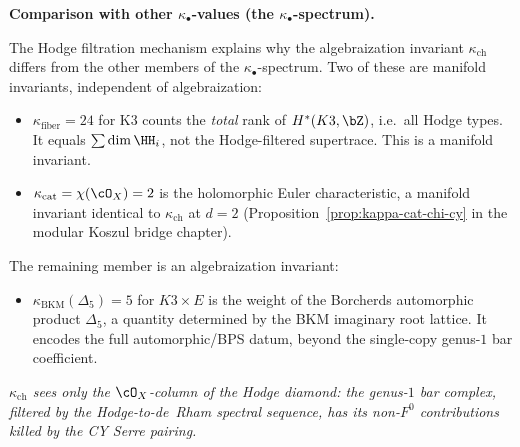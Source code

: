 \begin{remark}
\medskip\noindent
\textbf{Comparison with other $\kappa_\bullet$-values (the $\kappa_\bullet$-spectrum).}

\smallskip\noindent
The Hodge filtration mechanism explains why the algebraization invariant $\kappa_{\mathrm{ch}}$ differs from the other members of the $\kappa_\bullet$-spectrum. Two of these are manifold invariants, independent of algebraization:
\begin{itemize}
 \item $\kappa_{\mathrm{fiber}} = 24$ for K3 counts the \emph{total} rank of $H^*(K3, \bZ)$, i.e.\ all Hodge types. It equals $\sum \dim \HH_i$, not the Hodge-filtered supertrace. This is a manifold invariant.
 \item $\kappa_{\mathrm{cat}} = \chi(\cO_X) = 2$ is the holomorphic Euler characteristic, a manifold invariant identical to $\kappa_{\mathrm{ch}}$ at $d = 2$ (Proposition~\ref{prop:kappa-cat-chi-cy} in the modular Koszul bridge chapter).
\end{itemize}
The remaining member is an algebraization invariant:
\begin{itemize}
 \item $\kappa_{\mathrm{BKM}}(\Delta_5) = 5$ for $K3 \times E$ is the weight of the Borcherds automorphic product $\Delta_5$, a quantity determined by the BKM imaginary root lattice. It encodes the full automorphic/BPS datum, beyond the single-copy genus-$1$ bar coefficient.
\end{itemize}
\emph{$\kappa_{\mathrm{ch}}$ sees only the $\cO_X$-column of the Hodge diamond: the genus-$1$ bar complex, filtered by the Hodge-to-de~Rham spectral sequence, has its non-$F^0$ contributions killed by the CY Serre pairing.}
\end{remark}

